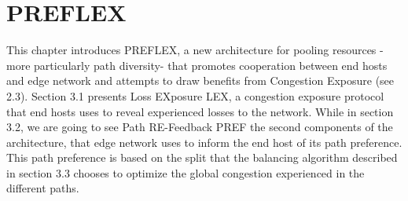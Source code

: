 \chapter{PREFLEX}
\label{chapter:preflex}
This chapter introduces PREFLEX, a new architecture for pooling resources -more particularly path diversity- that promotes cooperation between end hosts and edge network and attempts to draw benefits from Congestion Exposure (see 2.3). Section 3.1 presents Loss EXposure LEX, a congestion exposure protocol that end hosts uses to reveal experienced losses to the network. While in section 3.2, we are going to see Path RE-Feedback PREF the second components of the architecture, that edge network uses to inform the end host of its path preference. This path preference is based on  the split that the balancing algorithm described in section 3.3 chooses to optimize the global congestion experienced in the different paths.

